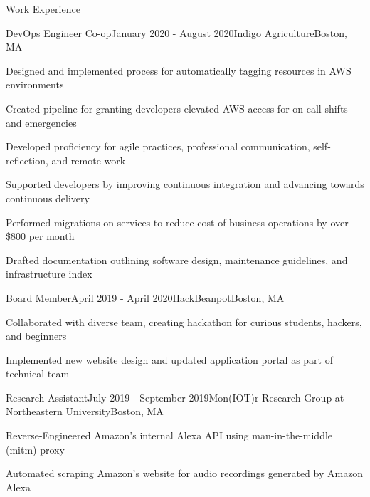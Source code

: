 \documentclass{resume}
\begin{document}
\begin{rSection}{Work Experience}

\begin{rSubsection}{DevOps Engineer Co-op}{January 2020 - August 2020}{Indigo Agriculture}{Boston, MA}
\item Designed and implemented process for automatically tagging resources in AWS environments
\item Created pipeline for granting developers elevated AWS access for on-call shifts and emergencies
\item Developed proficiency for agile practices, professional communication, self-reflection, and remote work
\item Supported developers by improving continuous integration and advancing towards continuous delivery
\item Performed migrations on services to reduce cost of business operations by over \$800 per month
\item Drafted documentation outlining software design, maintenance guidelines, and infrastructure index
\end{rSubsection}

\begin{rSubsection}{Board Member}{April 2019 - April 2020}{HackBeanpot}{Boston, MA}
\item Collaborated with diverse team, creating hackathon for curious students, hackers, and beginners
\item Implemented new website design and updated application portal as part of technical team
\end{rSubsection}

\begin{rSubsection}{Research Assistant}{July 2019 - September 2019}{Mon(IOT)r Research Group at Northeastern University}{Boston, MA}
\item Reverse-Engineered Amazon's internal Alexa API using man-in-the-middle (mitm) proxy 
\item Automated scraping Amazon's website for audio recordings generated by Amazon Alexa
\end{rSubsection}
\end{rSection}
\end{document}
